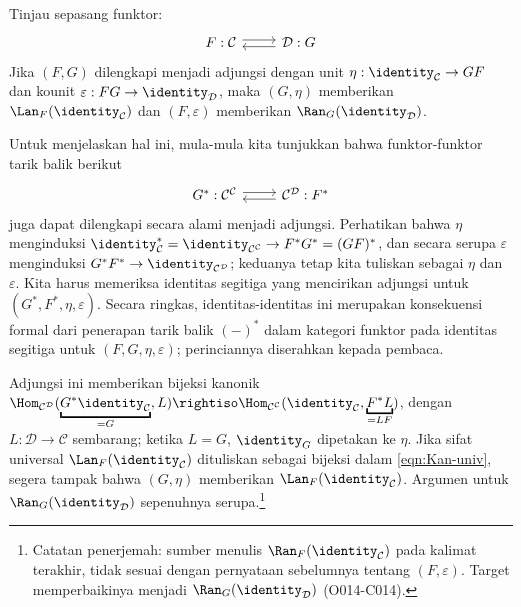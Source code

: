 \begin{contoh}
	Tinjau sepasang funktor:
	\[\begin{tikzcd}
		F: \mathcal{C} \arrow[r, shift left] & \mathcal{D}: G \arrow[l, shift left]
	\end{tikzcd}\]
	Jika $(F, G)$ dilengkapi menjadi adjungsi dengan unit
	$\eta: \identity_{\mathcal{C}} \to GF$ dan kounit
	$\varepsilon: FG \to \identity_{\mathcal{D}}$, maka $(G, \eta)$ memberikan
	$\Lan_F (\identity_{\mathcal{C}})$ dan $(F, \varepsilon)$ memberikan
	$\Ran_G (\identity_{\mathcal{D}})$.

	Untuk menjelaskan hal ini, mula-mula kita tunjukkan bahwa funktor-funktor
	tarik balik berikut
	\[\begin{tikzcd}
		G^*: \mathcal{C}^{\mathcal{C}} \arrow[r, shift left] &
		\mathcal{C}^{\mathcal{D}}: F^* \arrow[l, shift left]
	\end{tikzcd}\]
	juga dapat dilengkapi secara alami menjadi adjungsi. Perhatikan bahwa
	$\eta$ menginduksi
	$\identity_{\mathcal{C}}^* = \identity_{\mathcal{C}^{\mathcal{C}}}
	\to F^* G^* = (GF)^*$, dan secara serupa $\varepsilon$ menginduksi
	$G^* F^* \to \identity_{\mathcal{C}^{\mathcal{D}}}$; keduanya tetap kita
	tuliskan sebagai $\eta$ dan $\varepsilon$. Kita harus memeriksa identitas
	segitiga yang mencirikan adjungsi untuk
	$(G^*, F^*, \eta, \varepsilon)$. Secara ringkas, identitas-identitas ini
	merupakan konsekuensi formal dari penerapan tarik balik $(-)^*$ dalam
	kategori funktor pada identitas segitiga untuk
	$(F, G, \eta, \varepsilon)$; perinciannya diserahkan kepada pembaca.

	Adjungsi ini memberikan bijeksi kanonik
	$\Hom_{\mathcal{C}^{\mathcal{D}}}(\underbracket{G^* \identity_{\mathcal{C}}}_{= G}, L) \rightiso \Hom_{\mathcal{C}^{\mathcal{C}}}(\identity_{\mathcal{C}} , \underbracket{F^* L}_{=LF})$,
	dengan $L: \mathcal{D} \to \mathcal{C}$ sembarang; ketika $L = G$,
	$\identity_G$ dipetakan ke $\eta$. Jika sifat universal
	$\Lan_F (\identity_{\mathcal{C}})$ dituliskan sebagai bijeksi dalam
	\eqref{eqn:Kan-univ}, segera tampak bahwa $(G, \eta)$ memberikan
	$\Lan_F (\identity_{\mathcal{C}})$. Argumen untuk
	$\Ran_G (\identity_{\mathcal{D}})$ sepenuhnya serupa.\footnote{Catatan
	penerjemah: sumber menulis $\Ran_F(\identity_{\mathcal{C}})$ pada kalimat
	terakhir, tidak sesuai dengan pernyataan sebelumnya tentang
	$(F,\varepsilon)$. Target memperbaikinya menjadi
	$\Ran_G(\identity_{\mathcal{D}})$ (O014-C014).}
\end{contoh}

